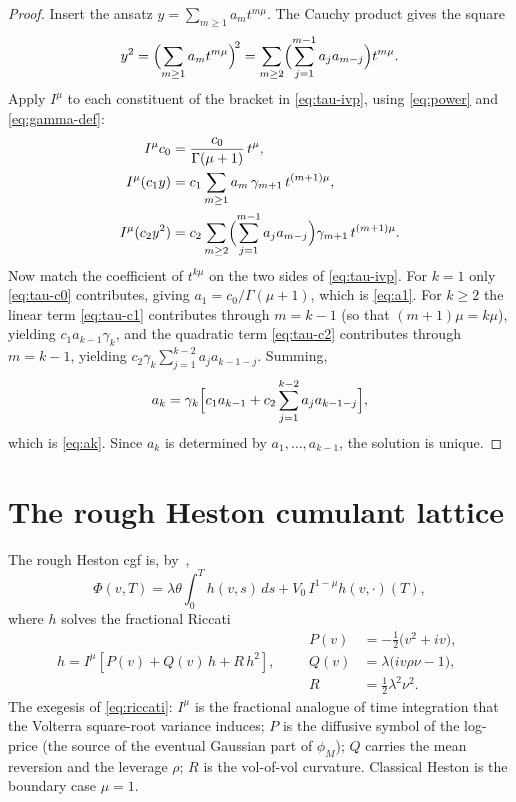 \documentclass[11pt]{article}
\newcommand{\Imu}{I^{\mu}}
\newcommand{\Ico}{I^{1-\mu}}
\begin{document}
\begin{proof}
Insert the ansatz $y=\sum_{m\ge1}a_mt^{m\mu}$. The Cauchy product gives the
square
\begin{equation}\label{eq:tau-square}
y^2=\Bigl(\sum_{m\ge1}a_mt^{m\mu}\Bigr)^{\!2}
=\sum_{m\ge2}\Bigl(\sum_{j=1}^{m-1}a_j a_{m-j}\Bigr)t^{m\mu}.
\end{equation}
Apply $\Imu$ to each constituent of the bracket in \eqref{eq:tau-ivp}, using
\eqref{eq:power} and \eqref{eq:gamma-def}:
\begin{align}
\Imu c_0&=\frac{c_0}{\Gamma(\mu+1)}\,t^{\mu},\label{eq:tau-c0}\\
\Imu(c_1 y)&=c_1\sum_{m\ge1}a_m\,\gamma_{m+1}\,t^{(m+1)\mu},
\label{eq:tau-c1}\\
\Imu(c_2 y^2)&=c_2\sum_{m\ge2}\Bigl(\sum_{j=1}^{m-1}a_j a_{m-j}\Bigr)
\gamma_{m+1}\,t^{(m+1)\mu}.\label{eq:tau-c2}
\end{align}
Now match the coefficient of $t^{k\mu}$ on the two sides of
\eqref{eq:tau-ivp}. For $k=1$ only \eqref{eq:tau-c0} contributes, giving
$a_1=c_0/\Gamma(\mu+1)$, which is \eqref{eq:a1}. For $k\ge2$ the linear term
\eqref{eq:tau-c1} contributes through $m=k-1$ (so that $(m+1)\mu=k\mu$),
yielding $c_1 a_{k-1}\gamma_k$, and the quadratic term \eqref{eq:tau-c2}
contributes through $m=k-1$, yielding
$c_2\gamma_k\sum_{j=1}^{k-2}a_j a_{k-1-j}$. Summing,
\begin{equation}\label{eq:tau-match}
a_k=\gamma_k\Bigl[c_1 a_{k-1}+c_2\sum_{j=1}^{k-2}a_j a_{k-1-j}\Bigr],
\end{equation}
which is \eqref{eq:ak}. Since $a_k$ is determined by $a_1,\dots,a_{k-1}$,
the solution is unique.
\end{proof}

\section{The rough Heston cumulant lattice}\label{sec:cgf}

The rough Heston cgf is, by~\cite{ElEuchRosenbaum},
\begin{equation}\label{eq:Phi}
\Phi(v,T)=\lambda\theta\!\int_0^T h(v,s)\,ds+V_0\,\Ico h(v,\cdot)(T),
\end{equation}
where $h$ solves the fractional Riccati
\begin{equation}\label{eq:riccati}
h=\Imu\!\left[P(v)+Q(v)\,h+R\,h^2\right],\qquad
\begin{aligned}
P(v)&=-\tfrac12\bigl(v^2+iv\bigr),\\
Q(v)&=\lambda\bigl(iv\rho\nu-1\bigr),\\
R&=\tfrac12\lambda^2\nu^2 .
\end{aligned}
\end{equation}
The exegesis of \eqref{eq:riccati}: $\Imu$ is the fractional analogue of
time integration that the Volterra square-root variance induces; $P$ is the
diffusive symbol of the log-price (the source of the eventual Gaussian part
of $\phi_M$); $Q$ carries the mean reversion and the leverage $\rho$; $R$ is
the vol-of-vol curvature. Classical Heston is the boundary case $\mu=1$.
\end{document}
